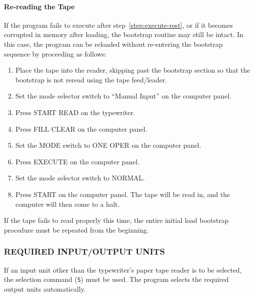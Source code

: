 \paragraph{Re-reading the Tape}

If the program fails to execute after step~\ref{step:execute-rest}, or if it becomes corrupted in memory after loading, the bootstrap routine may still be intact. In this case, the program can be reloaded without re-entering the bootstrap sequence by proceeding as follows:

\begin{enumerate}[label=\alph*)]
    \item Place the tape into the reader, skipping past the bootstrap section so that the bootstrap is not reread using the tape feed/leader.
    \item \label{step:retry_manual} Set the mode selector switch to ``Manual Input'' on the computer panel.
    \item Press \textsf{START READ} on the typewriter.
    \item Press \textsf{FILL CLEAR} on the computer panel.
    \item Set the \textsf{MODE} switch to \textsf{ONE OPER} on the computer panel.
    \item Press \textsf{EXECUTE} on the computer panel.
    \item Set the mode selector switch to \textsf{NORMAL}.
    \item \label{step:retry_start} Press \textsf{START} on the computer panel. The tape will be read in, and the computer will then come to a halt. 
\end{enumerate}

If the tape fails to read properly this time, the entire initial load bootstrap procedure must be repeated from the beginning.

\subsubsection*{REQUIRED INPUT/OUTPUT UNITS}
If an input unit other than the typewriter's paper tape reader is to be selected, the selection command (\texttt{S}) must be used. The program selects the required output units automatically.

